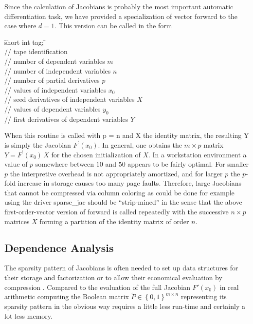 \documentclass[11pt,twoside]{article}
\begin{document}
Since the calculation of Jacobians is probably the most important
automatic differentia\-tion task, we have provided a specialization
of vector {\sf forward} to the case where $d = 1$. This version can be 
called in the form
%
\begin{tabbing}
\hspace{0.5in}\={\sf short int tag;} \hspace{1.1in}\= \kill    %
\\
         \> // tape identification \\
                 \> // number of dependent variables $m$\\
                 \> // number of independent variables $n$\\
                 \> // number of partial derivatives $p$ \\
          \> // values of independent variables $x_0$\\
        \> // seed derivatives of independent variables $X$\\
           \> // values of dependent variables $y_0$\\
        \> // first derivatives of dependent variables $Y$
\end{tabbing}
%
When this routine is called with {\sf p} = {\sf n} and {\sf X} the identity matrix,
the resulting {\sf Y} is simply the Jacobian $F^\prime(x_0)$. In general,
one obtains the $m\times p$ matrix $Y=F^\prime(x_0)\,X $ for the
chosen initialization of $X$. In a workstation environment a value
of $p$ somewhere between $10$ and $50$
appears to be fairly optimal. For smaller $p$ the interpretive
overhead is not appropriately amortized, and for larger $p$ the
$p$-fold increase in storage causes too many page faults. Therefore,
large Jacobians that cannot be compressed via column coloring
as could be done for example using the driver {\sf sparse\_jac}
should be ``strip-mined'' in the sense that the above
first-order-vector version of {\sf forward} is called 
repeatedly with the successive \mbox{$n \times p$} matrices $X$ forming
a partition of the identity matrix of order $n$.
%
\subsection{Dependence Analysis}
%
\label{ProBit}
%
The sparsity pattern of Jacobians is often needed to set up data structures
for their storage and factorization or to allow their economical evaluation
by compression \cite{BeKh96}. Compared to the evaluation of the full
Jacobian $F'(x_0)$ in real arithmetic computing the Boolean matrix
$\tilde{P}\in\left\{0,1\right\}^{m\times n}$ representing its sparsity
pattern in the obvious way requires a little less run-time and
certainly a lot less memory.
\end{document}
